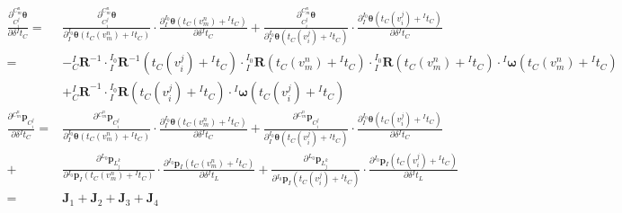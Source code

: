 \begin{equation*}
  \begin{aligned}
    \frac{\partial ^{C_m^n}_{C_i^j}\boldsymbol{\theta}}{\partial \delta{^{I}t_{C}}}= &
    \frac{\partial ^{C_m^n}_{C_i^j}\boldsymbol{\theta}}{\partial {{^{I_0}_{I}}\boldsymbol{\theta}\left( t_{C}(v_m^n)+{^{I}t_C}\right) }}\cdot
    \frac{\partial {{^{I_0}_{I}}\boldsymbol{\theta}\left( t_{C}(v_m^n)+{^{I}t_C}\right) }}{\partial \delta {^{I}t_{C}}}
    +
    \frac{\partial ^{C_m^n}_{C_i^j}\boldsymbol{\theta}}{\partial {{^{I_0}_{I}}\boldsymbol{\theta}\left( t_{C}(v_i^j)+{^{I}t_C}\right) }}\cdot
    \frac{\partial {{^{I_0}_{I}}\boldsymbol{\theta}\left( t_{C}(v_i^j)+{^{I}t_C}\right) }}{\partial \delta {^{I}t_{C}}}
    \\
    =                                                                                & -{{^{I}_{C}}\boldsymbol{R}^{-1}}\cdot{{^{I_0}_{I}}\boldsymbol{R}^{-1}\left( t_{C}(v_i^j)+{^{I}t_C}\right) }
    \cdot{{^{I_0}_{I}}\boldsymbol{R}\left( t_{C}(v_m^n)+{^{I}t_C}\right) }
    \cdot{{^{I_0}_{I}}\boldsymbol{R}\left( t_{C}(v_m^n)+{^{I}t_C}\right) }
    \cdot{^{I}\boldsymbol{\omega}}\left( t_{C}(v_m^n)+{^{I}t_C}\right)
    \\&+{{^{I}_{C}}\boldsymbol{R}}^{-1}
    \cdot{{^{I_0}_{I}}\boldsymbol{R}\left( t_{C}(v_i^j)+{^{I}t_C}\right) }
    \cdot{^{I}\boldsymbol{\omega}}\left( t_{C}(v_i^j)+{^{I}t_C}\right)
    \\
    \frac{\partial {^{C_m^n}\boldsymbol{p}_{C_i^j}}}{\partial \delta {^{I}t_{C}}}=   &
    \frac{\partial {^{C_m^n}\boldsymbol{p}_{C_i^j}}}{\partial {{^{I_0}_{I}}\boldsymbol{\theta}\left( t_{C}(v_m^n)+{^{I}t_C}\right) }}\cdot
    \frac{\partial {{^{I_0}_{I}}\boldsymbol{\theta}\left( t_{C}(v_m^n)+{^{I}t_C}\right) }}{\partial \delta {^{I}t_{C}}}
    +
    \frac{\partial {^{C_m^n}\boldsymbol{p}_{C_i^j}}}{\partial {{^{I_0}_{I}}\boldsymbol{\theta}\left( t_{C}(v_i^j)+{^{I}t_C}\right) }}\cdot
    \frac{\partial {{^{I_0}_{I}}\boldsymbol{\theta}\left( t_{C}(v_i^j)+{^{I}t_C}\right) }}{\partial \delta {^{I}t_{C}}}
    \\
    +                                                                                &
    \frac{\partial {^{L_0}\boldsymbol{p}_{L_j^k}}}{\partial {{^{I_0}}\boldsymbol{p}_{I}\left( t_{C}(v_m^n)+{^{I}t_C}\right) }}
    \cdot\frac{\partial {{^{I_0}}\boldsymbol{p}_{I}\left( t_{C}(v_m^n)+{^{I}t_C}\right) }}{\partial \delta {^{I}t_{L}}}
    +
    \frac{\partial {^{L_0}\boldsymbol{p}_{L_j^k}}}{\partial {{^{I_0}}\boldsymbol{p}_{I}\left( t_{C}(v_i^j)+{^{I}t_C}\right) }}
    \cdot\frac{\partial {{^{I_0}}\boldsymbol{p}_{I}\left( t_{C}(v_i^j)+{^{I}t_C}\right) }}{\partial \delta {^{I}t_{L}}}
    \\
    =                                                                                & \boldsymbol{J}_1+\boldsymbol{J}_2+\boldsymbol{J}_3+\boldsymbol{J}_4
  \end{aligned}
\end{equation*}
